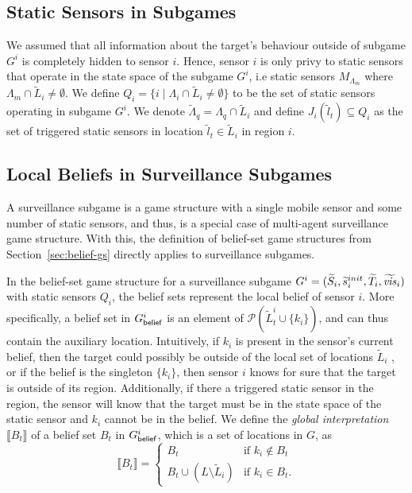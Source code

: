 \subsection{Static Sensors in Subgames}
We assumed that all information about the target's behaviour outside of subgame $G^i$ is completely  hidden to sensor $i$. Hence, sensor $i$ is only privy to static sensors that operate in the state space of the subgame $G^i$, i.e static sensors $M_{\Lambda_m}$ where $\Lambda_m \cap \widetilde{L}_i \neq \emptyset$. We define $Q_i = \{i \mid \Lambda_{i} \cap \widetilde{L}_i \neq \emptyset\}$ to be the set of static sensors operating in subgame $G^i$. We denote $\widetilde{\Lambda}_q = \Lambda_{q} \cap \widetilde{L}_i$ and define $J_i(\widetilde l_t)\subseteq Q_i$ as the set of triggered static sensors in location $\widetilde l_t \in \widetilde L_i$ in region $i$.

\subsection{Local Beliefs in Surveillance Subgames}\label{sec:local-games}
A surveillance subgame is a game structure with a single mobile sensor and some number of static sensors, and thus, is  a special case of multi-agent surveillance game structure. With this, the definition of  belief-set game structures from Section~\ref{sec:belief-gs} directly applies to surveillance subgames.

In the belief-set game structure for a surveillance subgame $G^{i} = (\widetilde{S}_i,\widetilde{s}_i^{init},\widetilde{T}_i,\widetilde{\mathit{vis}}_i)$ with static sensors $Q_i$, the belief sets represent the local belief of sensor $i$. More specifically, a belief set in $G^{i}_{\mathsf{belief}}$ is an element of  $\mathcal{P}(\widetilde{L}^i_t \cup \{k_i\})$, and can thus contain the auxiliary location. Intuitively, if $ k_i$ is present in the sensor's current belief, then the target could possibly be outside of the local set of locations $\widetilde L_i$ , or if the belief is the singleton $\{k_i\}$, then sensor $i$ knows for sure that the target is outside of its region. Additionally, if there a triggered static sensor in the region, the sensor will know that the target must be in the state space of the static sensor and $k_i$ cannot be in the belief.
We define the \emph{global interpretation} $\llbracket B_t\rrbracket$ of a belief set $B_t$ in $G^{i}_{\mathsf{belief}}$, which is a set of locations in $G$, as
 \[\llbracket B_t\rrbracket = \begin{cases}
B_t & \text{if } k_i \not\in B_t\\
B_t \cup (L \setminus \widetilde L_i) & \text{if } k_i  \in B_t.
\end{cases}
\]


